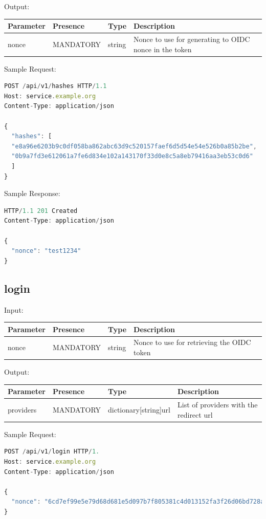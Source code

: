 Output:

\begin{tabular}{|l|l|l|l|}
	\hline
	Parameter & Presence & Type & Description \\ \hline
	nonce & MANDATORY & string & Nonce to use for generating to OIDC nonce in the token \\ \hline
\end{tabular}

Sample Request:
\begin{lstlisting}[caption={hashes request}, captionpos=b, language=JavaScript, label={lst:hashesrequest}]
POST /api/v1/hashes HTTP/1.1
Host: service.example.org
Content-Type: application/json

{
  "hashes": [
  "e8a96e6203b9c0df058ba862abc63d9c520157faef6d5d54e54e526b0a85b2be",
  "0b9a7fd3e612061a7fe6d834e102a143170f33d0e8c5a8eb79416aa3eb53c0d6"
  ]
}
\end{lstlisting}

Sample Response:
\begin{lstlisting}[caption={hashes response}, captionpos=b, language=JavaScript, label={lst:hashesresponse}]
HTTP/1.1 201 Created
Content-Type: application/json

{
  "nonce": "test1234"
}
\end{lstlisting}

\subsection{login}
Input:

\begin{tabular}{|l|l|l|l|}
	\hline
	Parameter & Presence & Type & Description \\ \hline
	nonce & MANDATORY & string & Nonce to use for retrieving the OIDC token \\ \hline
\end{tabular}

Output:

\begin{tabular}{|l|l|l|l|}
	\hline
	Parameter & Presence & Type & Description \\ \hline
	providers & MANDATORY & dictionary[string]url & List of providers with the redirect url \\ \hline
\end{tabular}

Sample Request:
\begin{lstlisting}[caption={login request}, captionpos=b, language=JavaScript, label={lst:loginrequest}]
POST /api/v1/login HTTP/1.
Host: service.example.org
Content-Type: application/json

{
  "nonce": "6cd7ef99e5e79d68d681e5d097b7f805381c4d013152fa3f26d06bd728ae49fa"
}
\end{lstlisting}

